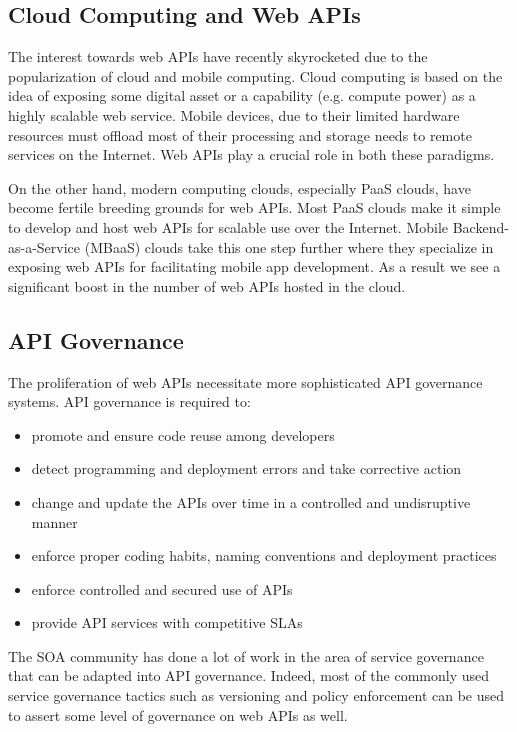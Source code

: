 \subsection{Cloud Computing and Web APIs}
The interest towards web APIs have recently skyrocketed due to the popularization of cloud and mobile computing.
Cloud computing is based on the idea of exposing some digital asset or a capability (e.g. compute power) as a highly scalable web service. 
Mobile devices, due to their limited hardware
resources must offload most of their processing and storage needs to remote services on the Internet. 
Web APIs play a crucial role in both these paradigms. 

On the other hand, modern computing clouds, especially PaaS clouds, have become fertile breeding grounds for web APIs. 
Most PaaS clouds make it simple to develop and host web APIs for scalable use over the Internet. Mobile 
Backend-as-a-Service (MBaaS) clouds take this one step further where they specialize in exposing web APIs for facilitating mobile
app development. As a result we see a significant boost in the number of web APIs hosted in the cloud.

\subsection{API Governance}
The proliferation of web APIs necessitate more sophisticated API governance systems. API governance is required to:
\begin{itemize}
\item promote and ensure code reuse among developers
\item detect programming and deployment errors and take corrective action
\item change and update the APIs over time in a controlled and undisruptive manner
\item enforce proper coding habits, naming conventions and deployment practices
\item enforce controlled and secured use of APIs
\item provide API services with competitive SLAs
\end{itemize}

The SOA community has done a lot of work in the area of service governance that can be adapted into
API governance. Indeed, most of the commonly used service governance tactics such as versioning and policy enforcement
can be used to assert some level of governance on web APIs as well.

